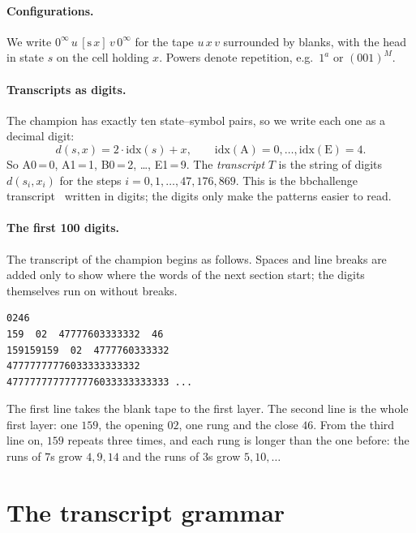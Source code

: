 \documentclass[11pt]{article}
\theoremstyle{definition}
\theoremstyle{remark}
\newcommand{\hd}[2]{[\mathrm{#1}\,#2]}
\newcommand{\Z}{0^{\infty}}
\begin{document}
\paragraph{Configurations.} We write $\Z\,u\,\hd{s}{x}\,v\,\Z$ for the tape $u\,x\,v$
surrounded by blanks, with the head in state $s$ on the cell holding $x$. Powers denote
repetition, e.g.\ $1^a$ or $(001)^M$.

\paragraph{Transcripts as digits.} The champion has exactly ten state--symbol pairs, so
we write each one as a decimal digit:
\[
d(s,x) = 2\cdot\mathrm{idx}(s) + x,\qquad \mathrm{idx}(\mathrm{A})=0,\dots,
\mathrm{idx}(\mathrm{E})=4.
\]
So A0\,=\,0, A1\,=\,1, B0\,=\,2, \dots, E1\,=\,9. The \emph{transcript} $T$ is the
string of digits $d(s_i,x_i)$ for the steps $i=0,1,\dots,47{,}176{,}869$. This is the
bbchallenge transcript~\cite{bbchallenge} written in digits; the digits only make the
patterns easier to read.

\paragraph{The first 100 digits.} The transcript of the champion begins as follows.
Spaces and line breaks are added only to show where the words of the next section
start; the digits themselves run on without breaks.
\begin{center}
\begin{minipage}{0.8\linewidth}
\begin{verbatim}
0246
159  02  47777603333332  46
159159159  02  4777760333332
47777777776033333333332
4777777777777776033333333333 ...
\end{verbatim}
\end{minipage}
\end{center}
The first line takes the blank tape to the first layer. The second line is the whole
first layer: one $159$, the opening $02$, one rung and the close $46$. From the third
line on, $159$ repeats three times, and each rung is longer than the one before: the
runs of $7$s grow $4, 9, 14$ and the runs of $3$s grow $5, 10, \dots$

\section{The transcript grammar}
\end{document}
